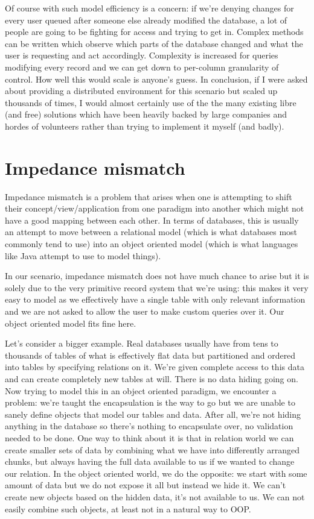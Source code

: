 \documentclass{report}
\begin{document}
Of course with such model efficiency is a concern: if we're denying
changes for every user queued after someone else already modified the
database, a lot of people are going to be fighting for access and
trying to get in. Complex methods can be written which observe which
parts of the database changed and what the user is requesting and act
accordingly. Complexity is increased for queries modifying every
record and we can get down to per-column granularity of control. How
well this would scale is anyone's guess. In conclusion, if I were
asked about providing a distributed environment for this scenario but
scaled up thousands of times, I would almost certainly use of the the
many existing libre (and free) solutions which have been heavily
backed by large companies and hordes of volunteers rather than trying
to implement it myself (and badly).

\section*{Impedance mismatch}
Impedance mismatch is a problem that arises when one is attempting to
shift their concept/view/application from one paradigm into another
which might not have a good mapping between each other. In terms of
databases, this is usually an attempt to move between a relational
model (which is what databases most commonly tend to use) into an
object oriented model (which is what languages like Java attempt to
use to model things).

In our scenario, impedance mismatch does not have much chance to arise
but it is solely due to the very primitive record system that we're
using: this makes it very easy to model as we effectively have a
single table with only relevant information and we are not asked to
allow the user to make custom queries over it. Our object oriented
model fits fine here.

Let's consider a bigger example. Real databases usually have from tens
to thousands of tables of what is effectively flat data but
partitioned and ordered into tables by specifying relations on it.
We're given complete access to this data and can create completely new
tables at will. There is no data hiding going on. Now trying to model
this in an object oriented paradigm, we encounter a problem: we're
taught the encapsulation is the way to go but we are unable to sanely
define objects that model our tables and data. After all, we're not
hiding anything in the database so there's nothing to encapsulate
over, no validation needed to be done. One way to think about it is
that in relation world we can create smaller sets of data by combining
what we have into differently arranged chunks, but always having the
full data available to us if we wanted to change our relation. In the
object oriented world, we do the opposite: we start with some amount
of data but we do not expose it all but instead we hide it. We can't
create new objects based on the hidden data, it's not available to us.
We can not easily combine such objects, at least not in a natural way
to OOP.
\end{document}
